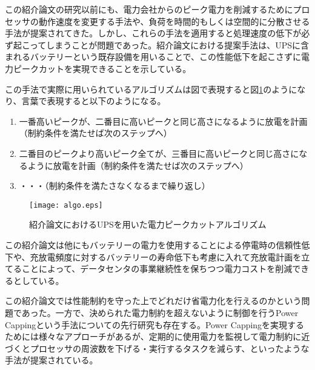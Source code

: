 この紹介論文の研究以前にも、電力会社からのピーク電力を削減するためにプロセッサの動作速度を変更する手法\cite{Chen:2005:MSE:1064212.1064253,Isci:2006:AEM:1194816.1194850,Raghavendra:2008:NPS:1353534.1346289,4658632,4658631}や、負荷を時間的もしくは空間的に分散させる手法\cite{Unleash,Moore:2005:MSC:1247360.1247365}が提案されてきた。しかし、これらの手法を適用すると処理速度の低下が必ず起こってしまうことが問題であった。紹介論文における提案手法は、UPSに含まれるバッテリーという既存設備を用いることで、この性能低下を起こさずに電力ピークカットを実現できることを示している。

この手法で実際に用いられているアルゴリズムは図で表現すると図\ref{fig:algo}のようになり、言葉で表現すると以下のようになる。

\begin{enumerate}
  \item 一番高いピークが、二番目に高いピークと同じ高さになるように放電を計画（制約条件を満たせば次のステップへ）
  \item 二番目のピークより高いピーク全てが、三番目に高いピークと同じ高さになるように放電を計画（制約条件を満たせば次のステップへ）
  \item ・・・（制約条件を満たさなくなるまで繰り返し）
\end{enumerate}

\begin{figure}[t]
 \begin{center}
  \texttt{[image: algo.eps]}
 \end{center}
 \caption{紹介論文\cite{Govindan:2011:BLT:2024723.2000105}におけるUPSを用いた電力ピークカットアルゴリズム}
 \label{fig:algo}
\end{figure}

この紹介論文は他にもバッテリーの電力を使用することによる停電時の信頼性低下や、充放電頻度に対するバッテリーの寿命低下も考慮に入れて充放電計画を立てることによって、データセンタの事業継続性を保ちつつ電力コストを削減できるとしている。

この紹介論文では性能制約を守った上でどれだけ省電力化を行えるのかという問題であった。一方で、決められた電力制約を超えないように制御を行うPower Cappingという手法についての先行研究も存在する\cite{Fan:2007:PPW:1273440.1250665}。Power Cappingを実現するためには様々なアプローチがあるが、定期的に使用電力を監視して電力制約に近づくとプロセッサの周波数を下げる・実行するタスクを減らす、といったような手法が提案されている。




